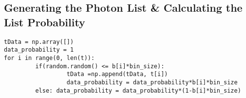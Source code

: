 \documentclass[aps,letterpaper,10pt]{revtex4}
\begin{document}
\vspace{3mm}

\subsection{Generating the Photon List \& Calculating the List Probability}

\begin{verbatim}
tData = np.array([])
data_probability = 1
for i in range(0, len(t)):
         if(random.random() <= b[i]*bin_size): 
                  tData =np.append(tData, t[i])
                  data_probability = data_probability*b[i]*bin_size
         else: data_probability = data_probability*(1-b[i]*bin_size)
\end{verbatim}
\end{document}

